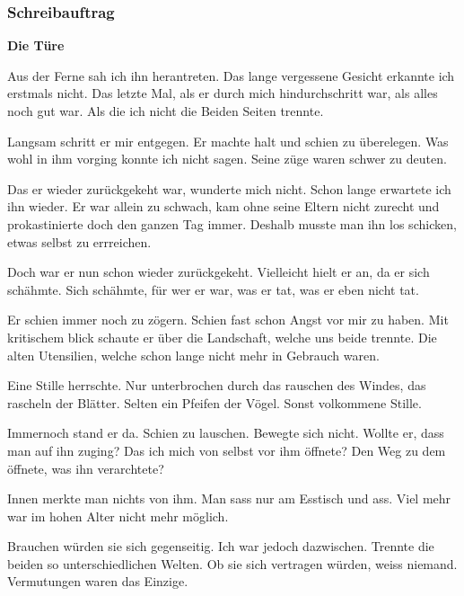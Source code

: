\documentclass{article}
\begin{document}
\section{Schreibauftrag}
\textbf{Die Türe}
\begin{multicols}{2}
    Aus der Ferne sah ich ihn herantreten. Das lange vergessene Gesicht erkannte ich erstmals nicht. Das letzte Mal, als er durch mich hindurchschritt war, als alles noch gut war. Als die ich nicht die Beiden Seiten trennte.
    
    Langsam schritt er mir entgegen. Er machte halt und schien zu überelegen. Was wohl in ihm vorging konnte ich nicht sagen. Seine züge waren schwer zu deuten.

    Das er wieder zurückgekeht war, wunderte mich nicht. Schon lange erwartete ich ihn wieder. Er war allein zu schwach, kam ohne seine Eltern nicht zurecht und prokastinierte doch den ganzen Tag immer. Deshalb musste man ihn los schicken, etwas selbst zu errreichen.

    Doch war er nun schon wieder zurückgekeht. Vielleicht hielt er an, da er sich schähmte. Sich schähmte, für wer er war, was er tat, was er eben nicht tat.

    Er schien immer noch zu zögern. Schien fast schon Angst vor mir zu haben. Mit kritischem blick schaute er über die Landschaft, welche uns beide trennte. Die alten Utensilien, welche schon lange nicht mehr in Gebrauch waren.

    Eine Stille herrschte. Nur unterbrochen durch das rauschen des Windes, das rascheln der Blätter. Selten ein Pfeifen der Vögel. Sonst volkommene Stille.

    Immernoch stand er da. Schien zu lauschen. Bewegte sich nicht. Wollte er, dass man auf ihn zuging? Das ich mich von selbst vor ihm öffnete? Den Weg zu dem öffnete, was ihn verarchtete?

    Innen merkte man nichts von ihm. Man sass nur am Esstisch und ass. Viel mehr war im hohen Alter nicht mehr möglich.

    Brauchen würden sie sich gegenseitig. Ich war jedoch dazwischen. Trennte die beiden so unterschiedlichen Welten. Ob sie sich vertragen würden, weiss niemand. Vermutungen waren das Einzige.
\end{multicols}
\newpage


\part{}
\end{document}
